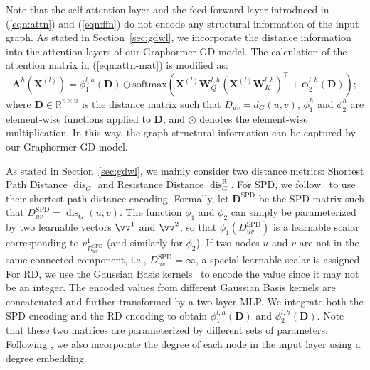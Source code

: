 \documentclass{article} %
\newcommand*{\dis}{{\operatorname{dis}}}
\newcommand*{\disR}{\operatorname{dis}^\mathrm{R}}
\begin{document}
Note that the self-attention layer and the feed-forward layer introduced in (\ref{eqn:attn}) and (\ref{eqn:ffn}) do not encode any structural information of the input graph. As stated in Section~\ref{sec:gdwl}, we incorporate the distance information into the attention layers of our Graphormer-GD model. The calculation of the attention matrix in (\ref{eqn:attn-mat}) is modified as:
\begin{equation}
    \label{eqn:attn-mat-gd}
    \mathbf A^h(\mathbf X^{(l)}) = \phi_1^{l,h}(\mathbf D)\odot\mathrm{softmax}\left(\mathbf X^{(l)} \mathbf W_Q^{l,h}(\mathbf X^{(l)} \mathbf W_K^{l,h})^{\top}+\mathbf \phi_2^{l,h}(\mathbf D)\right);
\end{equation}
where $\mathbf D\in\mathbb R^{n\times n}$ is the distance matrix such that $D_{uv}=d_G(u,v)$, $\phi_1^h$ and $\phi_2^h$ are element-wise functions applied to $\mathbf D$, and $\odot$ denotes the element-wise multiplication. In this way, the graph structural information can be captured by our Graphormer-GD model.

As stated in Section~\ref{sec:gdwl}, we mainly consider two distance metrics: Shortest Path Distance $\dis_G$ and Resistance Distance $\disR_G$. For SPD, we follow~\citet{ying2021transformers} to use their shortest path distance encoding. Formally, let $\mathbf D^{\text{SPD}}$ be the SPD matrix such that $D^\mathrm{SPD}_{uv}=\dis_G(u,v)$. The function $\phi_1$ and $\phi_2$ can simply be parameterized by two learnable vectors $\vv^1$ and $\vv^2$, so that $\phi_1(D^{\mathrm{SPD}}_{uv})$ is a learnable scalar corresponding to $v^1_{D^{\mathrm{SPD}}_{uv}}$ (and similarly for $\phi_2$). If two nodes $u$ and $v$ are not in the same connected component, i.e., $D^{\mathrm{SPD}}_{uv}=\infty$, a special learnable scalar is assigned. For RD, we use the Gaussian Basis kernels~\citep{scholkopf1997comparing} to encode the value since it may not be an integer. The encoded values from different Gaussian Basis kernels are concatenated and further transformed by a two-layer MLP. We integrate both the SPD encoding and the RD encoding to obtain $\phi_1^{l,h}(\mathbf D)$ and $\phi_2^{l,h}(\mathbf D)$. Note that these two matrices are parameterized by different sets of parameters. Following \citet{ying2021transformers}, we also incorporate the degree of each node in the input layer using a degree embedding.
\end{document}
